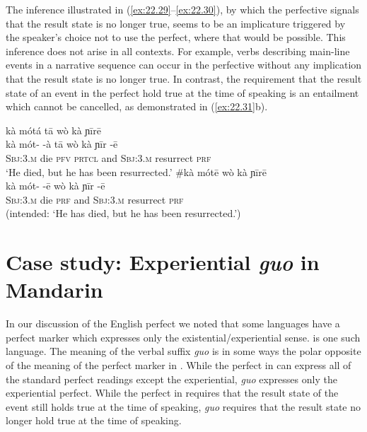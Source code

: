 The inference illustrated in (\ref{ex:22.29}--\ref{ex:22.30}), by which the perfective signals that the result state is no longer true, seems to be an implicature triggered by the speaker’s choice not to use the perfect, where that would be possible. This inference does not arise in all contexts. For example, verbs describing main-line events in a narrative sequence can occur in the perfective without any implication that the result state is no longer true. In contrast, the requirement that the result state of an event in the perfect hold true at the time of speaking is an entailment which cannot be cancelled, as demonstrated in (\ref{ex:22.31}b).

\ea \label{ex:22.31}
\ea  \glll kà  mótá  {}  tā  wò  kà  ɲīrē\\
kà  mót-  -à  tā  wò  kà  ɲīr  -ē\\
\textsc{Sbj:3.m}  die  \textsc{pfv}  \textsc{prtcl}  and  \textsc{Sbj:3.m}  resurrect  \textsc{prf}\\
\glt ‘He died, but he has been resurrected.’
\ex \glll  \#kà  mótē  {}  wò  kà  ɲīrē\\
  kà  mót-  -ē  wò  kà  ɲīr  -ē\\
\textsc{Sbj:3.m}  die  \textsc{prf}  and  \textsc{Sbj:3.m}  resurrect  \textsc{prf}\\
\glt (intended: ‘He has died, but he has been resurrected.’)
\z \z

\section{Case study: Experiential \textit{guo} in Mandarin}\label{sec:22.6}

In our discussion of the English perfect we noted that some languages have a perfect marker which expresses only the existential/experiential sense.  is one such language. The meaning of the verbal suffix \textit{guo} is in some ways the polar opposite of the meaning of the perfect marker in . While the perfect in  can express all of the standard perfect readings except the experiential, \textit{guo} expresses only the experiential perfect. While the perfect in  requires that the result state of the event still holds true at the time of speaking, \textit{guo} requires that the result state no longer hold true at the time of speaking.



